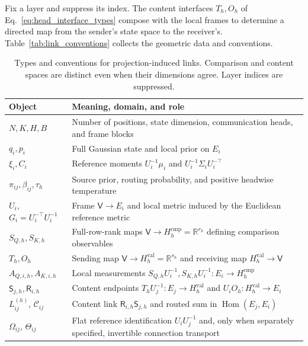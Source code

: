\documentclass[twoside,11pt]{article}
\begin{document}
Fix a layer and suppress its index. The content interfaces \(T_h,O_h\) of Eq.~\eqref{eq:head_interface_types} compose with the local frames to determine a directed map from the sender's state space to the receiver's. Table~\ref{tab:link_conventions} collects the geometric data and conventions.

\begin{table}[t]
\centering
\small
\renewcommand{\arraystretch}{1.12}
\begin{tabularx}{\textwidth}{@{}lX@{}}
\toprule
Object & Meaning, domain, and role \\
\midrule
$N,K,H,B$ & Number of positions, state dimension, communication heads, and frame blocks \\
$q_i,p_i$ & Full Gaussian state and local prior on $E_i$ \\
$\xi_i,C_i$ & Reference moments $U_i^{-1}\mu_i$ and $U_i^{-1}\Sigma_iU_i^{-\top}$ \\
$\pi_{ij},\beta_{ij},\tau_h$ & Source prior, routing probability, and positive headwise temperature \\

$U_i$, $G_i=U_i^{-\top}U_i^{-1}$ & Frame $\mathsf V\to E_i$ and local metric induced by the Euclidean reference metric \\
$S_{Q,h},S_{K,h}$ & Full-row-rank maps $\mathsf V\to H_h^{\mathrm{cmp}}=\mathbb R^{r_h}$ defining comparison observables \\
$T_h,O_h$ & Sending map $\mathsf V\to H_h^{\mathrm{val}}=\mathbb R^{s_h}$ and receiving map $H_h^{\mathrm{val}}\to\mathsf V$ \\
$A_{Q,i,h},A_{K,i,h}$ & Local measurements $S_{Q,h}U_i^{-1},S_{K,h}U_i^{-1}:E_i\to H_h^{\mathrm{cmp}}$ \\
$\mathsf S_{j,h},\mathsf R_{i,h}$ & Content endpoints $T_hU_j^{-1}:E_j\to H_h^{\mathrm{val}}$ and $U_iO_h:H_h^{\mathrm{val}}\to E_i$ \\
$L_{ij}^{(h)}$, $\mathcal C_{ij}$ & Content link $\mathsf R_{i,h}\mathsf S_{j,h}$ and routed sum in $\operatorname{Hom}(E_j,E_i)$ \\
$\Omega_{ij}$, $\Theta_{ij}$ & Flat reference identification $U_iU_j^{-1}$ and, only when separately specified, invertible connection transport \\
\bottomrule
\end{tabularx}
\caption{Types and conventions for projection-induced links. Comparison and content spaces are distinct even when their dimensions agree. Layer indices are suppressed.}
\label{tab:link_conventions}
\label{tab:notation}
\end{table}
\end{document}
